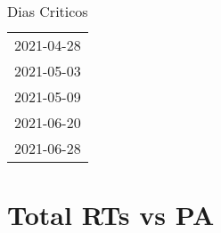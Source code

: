 \documentclass[
]{article}
\author{}
\date{\vspace{-2.5em}}
\begin{document}
\begin{table}[H]
    \centering
    \caption{Dias Criticos}
    \label{tab:dias_criticos}
    \begin{tabular}{c}
        \toprule
            2021-04-28 \\
            2021-05-03 \\
            2021-05-09 \\
            2021-06-20 \\
            2021-06-28 \\
        \bottomrule
    \end{tabular}
\end{table}

\tableofcontents
\newpage
\section{Total RTs vs PA}
\end{document}
